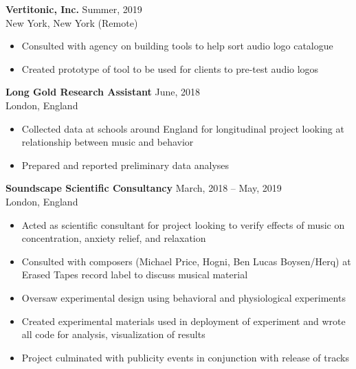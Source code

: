 \textbf{Vertitonic, Inc.} \hfill  Summer, 2019 \\
New York, New York (Remote) \hfill 
\begin{itemize} \itemsep -2pt %
\item Consulted with agency on building tools to help sort audio logo catalogue
\item Created prototype of tool to be used for clients to pre-test audio logos 
\end{itemize}

\textbf{Long Gold Research Assistant} \hfill  June, 2018 \\
London, England \hfill 
\begin{itemize} \itemsep -2pt %
\item Collected data at schools around England for longitudinal project looking at relationship between music and behavior
\item Prepared and reported preliminary data analyses
\end{itemize}

\textbf{Soundscape Scientific Consultancy} \hfill  March, 2018 -- May, 2019 \\
London, England \hfill 
\begin{itemize} \itemsep -2pt %
\item Acted as scientific consultant for project looking to verify effects of music on concentration, anxiety relief, and relaxation
\item Consulted with composers (Michael Price, Hogni, Ben Lucas Boysen/Herq) at Erased Tapes record label to discuss musical material 
\item Oversaw experimental design using behavioral and physiological experiments
\item Created experimental materials used in deployment of experiment and wrote all code for analysis, visualization of results
\item Project culminated with publicity events in conjunction with release of tracks
\end{itemize}


